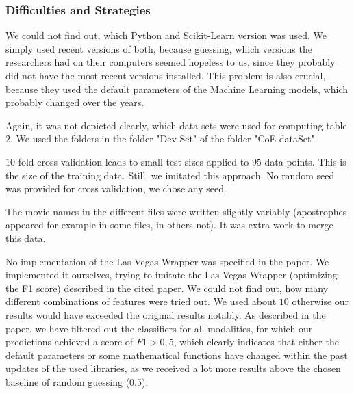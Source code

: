 \subsubsection*{Difficulties and Strategies}
We could not find out, which Python and Scikit-Learn version was used. We simply used recent versions of both, because guessing, which versions the researchers had on their computers seemed hopeless to us, since they probably did not have the most recent versions installed. This problem is also crucial, because they used the default parameters of the Machine Learning models, which probably changed over the years. 

Again, it was not depicted clearly, which data sets were used for computing table $2$. We used the folders in the folder "Dev Set" of the folder "CoE dataSet". 

$10$-fold cross validation leads to small test sizes applied to $95$ data points. This is the size of the training data. Still, we imitated this approach. No random seed was provided for cross validation, we chose any seed. 

The movie names in the different files were written slightly variably (apostrophes appeared for example in some files, in others not). It was extra work to merge this data. 

No implementation of the Las Vegas Wrapper was specified in the paper. We implemented it ourselves, trying to imitate the Las Vegas Wrapper (optimizing the F1 score) described in the cited paper. We could not find out, how many different combinations of features were tried out. We used about $10$ otherwise our results would have exceeded the original results notably. 
As described in the paper, we have filtered out the classifiers for all modalities, for which our predictions achieved a score of $F1>0,5$, which clearly indicates that either the default parameters or some mathematical functions have changed within the past updates of the used libraries, as we received a lot more results above the chosen baseline of random guessing ($0.5$).

